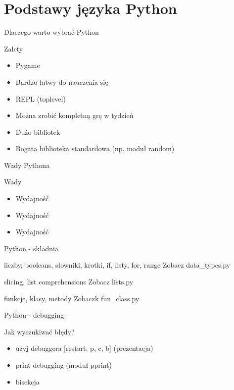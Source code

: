 \documentclass{beamer}
\begin{document}
\section{Podstawy języka Python}
\begin{frame}{Dlaczego warto wybrać Python}
  \begin{block}{Zalety}
    \begin{itemize}
    \item Pygame
    \item Bardzo łatwy do nauczenia się
    \item REPL (toplevel)
    \item Można zrobić kompletną grę w tydzień
    \item Dużo bibliotek
    \item Bogata biblioteka standardowa (np. moduł random)
    \end{itemize}
  \end{block}
\end{frame}

\begin{frame}{Wady Pythona}
  \begin{block}{Wady}
    \begin{itemize}
    \item Wydajność
    \item Wydajność
    \item Wydajność
    \end{itemize}
  \end{block}
\end{frame}

\begin{frame}{Python - składnia}
  \begin{block}{liczby, booleans, słowniki, krotki, if, listy, for, range}
    Zobacz data\_types.py
  \end{block}

  \begin{block}{slicing, list comprehensions}
    Zobacz lists.py
  \end{block}

  \begin{block}{funkcje, klasy, metody}
    Zobaczk fun\_class.py
  \end{block}
\end{frame}

\begin{frame}{Python - debugging}
  \begin{block}{Jak wyszukiwać błędy?}
    \begin{itemize}
    \item użyj debuggera [restart, p, c, b] (prezentacja)
    \item print debugging (moduł pprint)
    \item bisekcja
    \end{itemize}
  \end{block}
\end{frame}
\end{document}
